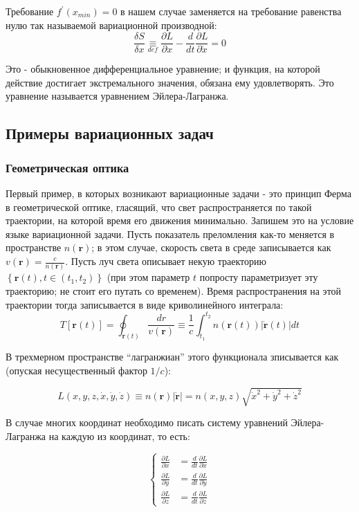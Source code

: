 \documentclass[a4paper,12pt]{article}
\begin{document}
\noindent
Требование $f^{\prime}(x_{min})=0$ в нашем случае заменяется на требование
равенства нулю так называемой вариационной производной:
\[
\frac{\delta S}{\delta x}\underset{def}{\equiv}\frac{\partial L}{\partial x}-\frac{d}{dt}\frac{\partial L}{\partial\dot{x}}=0
\]

\noindent
Это - обыкновенное дифференциальное уравнение; и функция, на которой
действие достигает экстремального значения, обязана ему удовлетворять.
Это уравнение называется уравнением Эйлера-Лагранжа.


\subsection*{Примеры вариационных задач}


\subsubsection*{Геометрическая оптика}

Первый пример, в которых возникают вариационные задачи - это принцип
Ферма в геометрической оптике, гласящий, что свет распространяется
по такой траектории, на которой время его движения минимально. Запишем
это на условие языке вариационной задачи. Пусть показатель преломления
как-то меняется в пространстве $n(\mathbf{r})$; в этом случае, скорость
света в среде записывается как $v(\mathbf{r})=\frac{c}{n(\mathbf{r})}$.
Пусть луч света описывает некую траекторию $\left\{ \mathbf{r}(t),t\in(t_{1},t_{2})\right\} $
(при этом параметр $t$ попросту параметризует эту траекторию; не
стоит его путать со временем). Время распространения на этой траектории
тогда записывается в виде криволинейного интеграла:
\[
T[\mathbf{r}(t)]=\oint_{\mathbf{r}(t)}\frac{dr}{v(\mathbf{r})}\equiv\frac{1}{c}\int_{t_{1}}^{t_{2}}n(\mathbf{r}(t))\left|\dot{\mathbf{r}}(t)\right|dt
\]

\noindent
В трехмерном пространстве ``лагранжиан'' этого функционала зписывается
как (опуская несущественный фактор $1/c$):

\[
L(x,y,z,\dot{x},\dot{y},\dot{z})\equiv n(\mathbf{r})|\dot{\mathbf{r}}|=n(x,y,z)\sqrt{\dot{x}^{2}+\dot{y}^{2}+\dot{z}^{2}}
\]

\noindent
В случае многих координат необходимо писать систему уравнений Эйлера-Лагранжа
на каждую из координат, то есть:

\[
\begin{cases}
\frac{\partial L}{\partial x} & =\frac{d}{dt}\frac{\partial L}{\partial\dot{x}}\\
\frac{\partial L}{\partial y} & =\frac{d}{dt}\frac{\partial L}{\partial\dot{y}}\\
\frac{\partial L}{\partial z} & =\frac{d}{dt}\frac{\partial L}{\partial\dot{z}}
\end{cases}
\]
\end{document}
